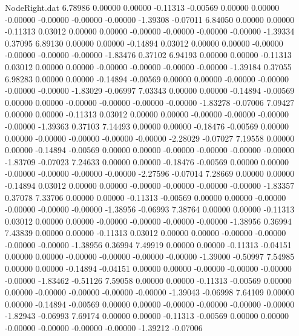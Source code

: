 \begin{filecontents}{NodeRight.dat}
   6.78986    0.00000    0.00000    -0.11313   -0.00569    0.00000    0.00000   -0.00000   -0.00000   -0.00000   -0.00000   -1.39308   -0.07011
   6.84050    0.00000    0.00000    -0.11313    0.03012    0.00000    0.00000   -0.00000   -0.00000   -0.00000   -0.00000   -1.39334    0.37095
   6.89130    0.00000    0.00000    -0.14894    0.03012    0.00000    0.00000   -0.00000   -0.00000   -0.00000   -0.00000   -1.83476    0.37102
   6.94193    0.00000    0.00000    -0.11313    0.03012    0.00000    0.00000   -0.00000   -0.00000   -0.00000   -0.00000   -1.39184    0.37055
   6.98283    0.00000    0.00000    -0.14894   -0.00569    0.00000    0.00000   -0.00000   -0.00000   -0.00000   -0.00000   -1.83029   -0.06997
   7.03343    0.00000    0.00000    -0.14894   -0.00569    0.00000    0.00000   -0.00000   -0.00000   -0.00000   -0.00000   -1.83278   -0.07006
   7.09427    0.00000    0.00000    -0.11313    0.03012    0.00000    0.00000   -0.00000   -0.00000   -0.00000   -0.00000   -1.39363    0.37103
   7.14493    0.00000    0.00000    -0.18476   -0.00569    0.00000    0.00000   -0.00000   -0.00000   -0.00000   -0.00000   -2.28029   -0.07027
   7.19558    0.00000    0.00000    -0.14894   -0.00569    0.00000    0.00000   -0.00000   -0.00000   -0.00000   -0.00000   -1.83709   -0.07023
   7.24633    0.00000    0.00000    -0.18476   -0.00569    0.00000    0.00000   -0.00000   -0.00000   -0.00000   -0.00000   -2.27596   -0.07014
   7.28669    0.00000    0.00000    -0.14894    0.03012    0.00000    0.00000   -0.00000   -0.00000   -0.00000   -0.00000   -1.83357    0.37078
   7.33706    0.00000    0.00000    -0.11313   -0.00569    0.00000    0.00000   -0.00000   -0.00000   -0.00000   -0.00000   -1.38956   -0.06993
   7.38764    0.00000    0.00000    -0.11313    0.03012    0.00000    0.00000   -0.00000   -0.00000   -0.00000   -0.00000   -1.38956    0.36994
   7.43839    0.00000    0.00000    -0.11313    0.03012    0.00000    0.00000   -0.00000   -0.00000   -0.00000   -0.00000   -1.38956    0.36994
   7.49919    0.00000    0.00000    -0.11313   -0.04151    0.00000    0.00000   -0.00000   -0.00000   -0.00000   -0.00000   -1.39000   -0.50997
   7.54985    0.00000    0.00000    -0.14894   -0.04151    0.00000    0.00000   -0.00000   -0.00000   -0.00000   -0.00000   -1.83462   -0.51126
   7.59058    0.00000    0.00000    -0.11313   -0.00569    0.00000    0.00000   -0.00000   -0.00000   -0.00000   -0.00000   -1.39043   -0.06998
   7.64109    0.00000    0.00000    -0.14894   -0.00569    0.00000    0.00000   -0.00000   -0.00000   -0.00000   -0.00000   -1.82943   -0.06993
   7.69174    0.00000    0.00000    -0.11313   -0.00569    0.00000    0.00000   -0.00000   -0.00000   -0.00000   -0.00000   -1.39212   -0.07006

\end{filecontents}
